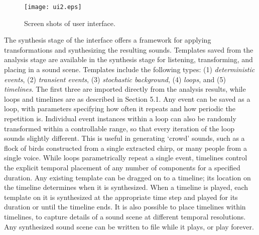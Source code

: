\documentclass[a4paper]{article}
\begin{document}
\begin{figure}[t]
\centering
\texttt{[image: ui2.eps]}
\caption{Screen shots of user interface. 
} %
\label{fig:ui}
\end{figure}
The synthesis stage of the interface offers a framework for applying 
transformations and synthesizing the resulting sounds. Templates 
saved from the analysis stage are available in the synthesis stage for 
listening, transforming, and placing in a sound scene. Templates 
include the following types: (1) \emph{deterministic events}, (2) \emph{transient events}, (3) 
\emph{stochastic background}, (4) \emph{loops}, and (5) \emph{timelines}. 
The first three are imported directly from the analysis results, while loops 
and timelines are as described in Section 5.1. 
Any event can be saved as a loop, with parameters specifying how often it repeats 
and how periodic the repetition is. Individual event instances within a loop can also be 
randomly transformed within a controllable range, so that every 
iteration of the loop sounds slightly different. This is useful in 
generating `crowd' sounds, such as a flock of birds constructed from a 
single extracted chirp, or many people from a single voice. 
While loops parametrically repeat a single event, timelines control the explicit  
temporal placement of any number of components for a specified duration.  
Any existing template can be dragged on to a timeline; its location on the 
timeline determines when it is synthesized. 
When a timeline is played, each template on it is synthesized at the appropriate 
time step and played for its duration or until the timeline ends. 
It is also possible to place 
timelines within timelines, to capture details of a sound scene at different 
temporal resolutions. Any synthesized sound scene can be written to file while it 
plays, or play forever.  
\end{document}
